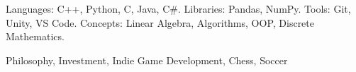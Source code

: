

\vspace{0em}
\newline
\begin{small} \color{black}
    Languages: C++, Python, C, Java, C\#.
Libraries: Pandas, NumPy.
Tools: Git, Unity, VS Code.
Concepts: Linear Algebra, Algorithms, OOP, Discrete Mathematics.
\end{small}

\newline
\begin{small} \color{black}
Philosophy, Investment, Indie Game Development, Chess, Soccer
\end{small}
